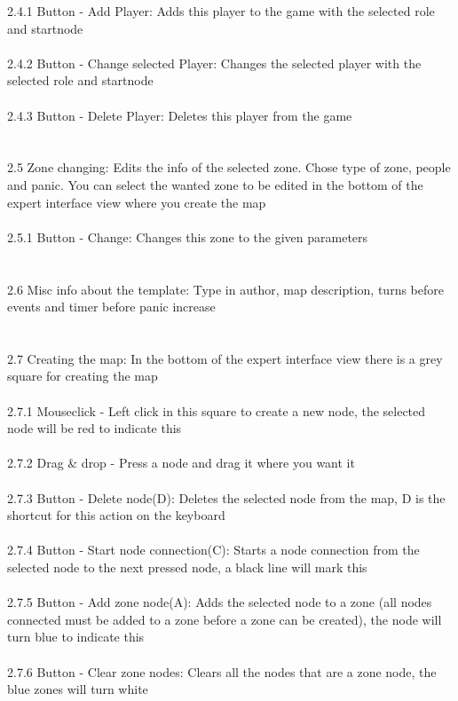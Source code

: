 	2.4.1 Button - Add Player: Adds this player to the game with the selected role and startnode\\
\\
	2.4.2 Button - Change selected Player: Changes the selected player with the selected role and startnode\\
\\
	2.4.3 Button - Delete Player: Deletes this player from the game\\	
\\	
\\
	2.5 Zone changing: Edits the info of the selected zone. Chose type of zone, people and panic. You can select the wanted zone to be edited in the bottom of the expert interface view where you create the map\\
\\	
	2.5.1 Button - Change: Changes this zone to the given parameters\\
\\	
\\
	2.6	Misc info about the template: Type in author, map description, turns before events and timer before panic increase\\
\\
\\			
	2.7 Creating the map: In the bottom of the expert interface view there is a grey square for creating the map\\
\\	
	2.7.1 Mouseclick - Left click in this square to create a new node, the selected node will be red to indicate this\\
\\	
	2.7.2 Drag \& drop - Press a node and drag it where you want it\\ 	
\\	
	2.7.3 Button - Delete node(D): Deletes the selected node from the map, D is the shortcut for this action on the keyboard\\
\\
	2.7.4 Button - Start node connection(C): Starts a node connection from the selected node to the next pressed node, a black line will mark this\\
\\
	2.7.5 Button - Add zone node(A): Adds the selected node to a zone (all nodes connected must be added to a zone before a zone can be created), the node will turn blue to indicate this\\
\\	
	2.7.6 Button - Clear zone nodes: Clears all the nodes that are a zone node, the blue zones will turn white\\
